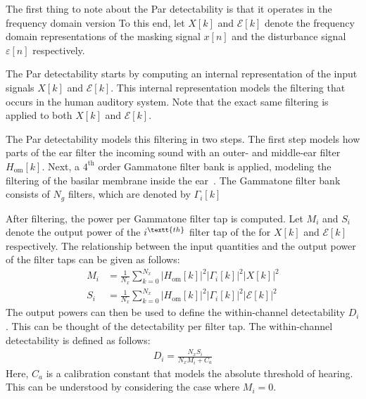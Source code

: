 The first thing to note about the Par detectability is that it operates in the frequency domain version 
To this end, let $X[k]$ and $\mathcal{E}[k]$ denote the frequency domain representations of the masking signal $x[n]$ and 
the disturbance signal $\varepsilon[n]$ respectively.

The Par detectability starts by computing an internal representation of the input signals $X[k]$ and $\mathcal{E}[k]$.
This internal representation models the filtering that occurs in the human auditory system.
Note that the exact same filtering is applied to both $X[k]$ and $\mathcal{E}[k]$.

The Par detectability models this filtering in two steps.
The first step models how parts of the ear filter the incoming sound with an outer- and middle-ear filter $H_\text{om}[k]$. 
Next, a $4^\text{th}$ order Gammatone filter bank is applied, modeling the filtering of the 
basilar membrane inside the ear~\cite{van2005perceptual}.
The Gammatone filter bank consists of $N_g$ filters, which are denoted by $\Gamma_i[k]$ 

After filtering, the power per Gammatone filter tap is computed.
Let $M_i$ and $S_i$ denote the output power of the $i^\textt{th}$ filter tap of the for $X[k]$ and 
$\mathcal{E}[k]$ respectively.
The relationship between the input quantities and the output power of the filter taps can be given as follows:
\begin{align}
    M_i &= \frac{1}{N_x}\sum_{k=0}^{N_x}\left|H_\text{om}[k]\right|^2\left|\Gamma_i[k]\right|^2\left|X[k]\right|^2 \\
    S_i &= \frac{1}{N_x}\sum_{k=0}^{N_x}\left|H_\text{om}[k]\right|^2\left|\Gamma_i[k]\right|^2\left|\mathcal{E}[k]\right|^2 
\end{align}
The output powers can then be used to define the within-channel detectability $D_i$.
This can be thought of the detectability per filter tap.
The within-channel detectability is defined as follows:
\begin{align}
    D_i = \frac{N_xS_i}{N_xM_i + C_a}
\end{align}
Here, $C_a$ is a calibration constant that models the absolute threshold of hearing.
This can be understood by considering the case where $M_i = 0$.

